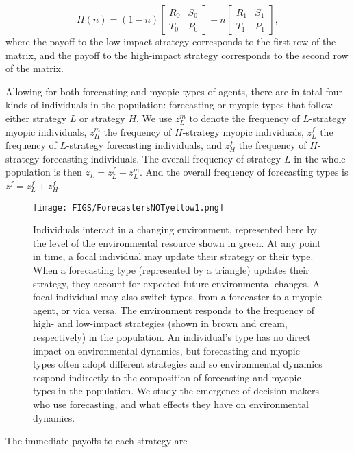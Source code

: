 \documentclass{article}
\begin{document}
\begin{equation}
    \Pi(n)=(1-n)
    \begin{bmatrix}
R_0&S_0\\
T_0&P_0
\end{bmatrix}
+n\begin{bmatrix}
R_1&S_1\\
T_1&P_1
\end{bmatrix},
\end{equation}
where the payoff to the low-impact strategy corresponds to the first row of the matrix, and the payoff to the high-impact strategy corresponds to the second row of the matrix. 

Allowing for both forecasting and myopic types of agents, there are in total four kinds of individuals in the population: forecasting or myopic types that follow either strategy $L$ or strategy $H$. We use $z_L^m$ to denote the frequency of $L$-strategy myopic individuals, $z_H^m$ the frequency of $H$-strategy myopic individuals, $z_L^f$  the frequency of $L$-strategy forecasting individuals, and $z_H^f$  the frequency of $H$-strategy forecasting individuals. The overall frequency of strategy $L$ in the whole population is then $z_L=z_L^f+z_L^m$. And the overall frequency of forecasting types is $z^f=z_L^f+z_H^f$.
\begin{figure}
    \centering
    \texttt{[image: FIGS/ForecastersNOTyellow1.png]}
    \caption{Individuals interact in a changing environment, represented here by the level of the environmental resource shown in green. At any point in time, a focal individual may update their strategy or their type. When a forecasting type (represented by a triangle) updates their strategy, they account for expected future environmental changes. A focal individual may also switch types, from a forecaster to a myopic agent, or vica versa. The environment responds to the frequency of high- and low-impact strategies (shown in brown and cream, respectively) in the population. An individual's type has no direct impact on environmental dynamics, but forecasting and myopic types often adopt different strategies and so environmental dynamics respond indirectly to the composition of forecasting and myopic types in the population. We study the emergence of decision-makers who use forecasting, and what effects they have on environmental dynamics.
    }
    \label{process}
\end{figure}

The immediate payoffs to each strategy are 
\end{document}
